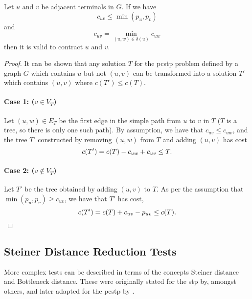\begin{theorem}
  Let $u$ and $v$ be adjacent terminals in $G$. If we have
  \[c_{uv} \leq \min(p_u, p_v)\]
  and
  \[c_{uv} = \min_{(u, w) \in \delta(u)}c_{uw}\]
  then it is valid to contract $u$ and $v$.
\end{theorem}
\begin{proof}
  It can be shown that any solution $T$ for the \gls{pcstp} problem defined by a graph $G$
  which contains $u$ but not $(u,v)$ can
  be transformed into a solution $T'$ which contains $(u,v)$ where $c(T') \leq c(T)$.

  \paragraph{Case 1: ($v \in V_T$)}
  Let $(u, w) \in E_T$ be the first edge in the simple path from $u$ to $v$ in $T$
  ($T$ is a tree, so there is only
  one such path). By assumption, we
  have that $c_{uv} \leq c_{uw}$, and the tree $T'$ constructed by removing $(u,w)$ from $T$ and
  adding $(u,v)$ has cost
  \[c(T') = c(T) - c_{uw} + c_{uv} \leq T\mathnormal{.}\]
  \paragraph{Case 2: ($v  \not\in V_T$)}
  Let $T'$ be the tree obtained by adding $(u,v)$ to $T$. As per the assumption that $\min(p_u, p_v) \geq c_{uv}$,
  we have that $T'$ has cost,
  \[c(T') = c(T) + c_{uv} - p_{uv} \leq c(T)\mathnormal{.}\]
\end{proof}


\subsection{Steiner Distance Reduction Tests}\label{sec:sd-red-test}
More complex tests can be described in terms
of the concepts Steiner distance and Bottleneck distance. These were originally stated for
the \gls{stp} by, amongst others, \citet{duin1989edge,duin1989reduction} and later
adapted for the \gls{pcstp} by \citet{uchoa2006reduction}.

